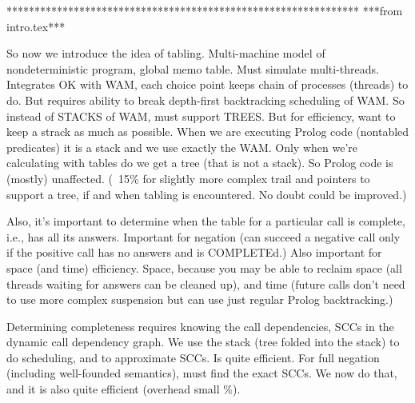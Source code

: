 ***************************************************************
***from intro.tex***

So now we introduce the idea of tabling.  Multi-machine model of
nondeterministic program, global memo table.  Must simulate
multi-threads.  Integrates OK with WAM, each choice point keeps chain
of processes (threads) to do.  But requires ability to break
depth-first backtracking scheduling of WAM.  So instead of STACKS of
WAM, must support TREES.  But for efficiency, want to keep a strack as
much as possible.  When we are executing Prolog code (nontabled
predicates) it is a stack and we use exactly the WAM.  Only when we're
calculating with tables do we get a tree (that is not a stack).  So
Prolog code is (mostly) unaffected.  (~15\% for slightly more complex
trail and pointers to support a tree, if and when tabling is
encountered.  No doubt could be improved.)

Also, it's important to determine when the table for a particular call
is complete, i.e., has all its answers.  Important for negation (can
succeed a negative call only if the positive call has no answers and
is COMPLETEd.)  Also important for space (and time) efficiency.
Space, because you may be able to reclaim space (all threads waiting
for answers can be cleaned up), and time (future calls don't need to
use more complex suspension but can use just regular Prolog
backtracking.)

Determining completeness requires knowing the call dependencies, SCCs
in the dynamic call dependency graph.  We use the stack (tree folded
into the stack) to do scheduling, and to approximate SCCs.  Is quite
efficient.  For full negation (including well-founded semantics), must
find the exact SCCs.  We now do that, and it is also quite efficient
(overhead small \%).

